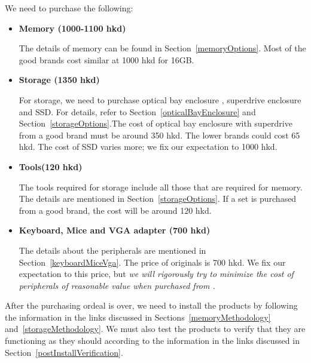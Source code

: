 We need to purchase the following:
\begin{itemize}
\item \textbf{Memory (1000-1100 hkd)}

The details of memory can be found in Section~\ref{memoryOptions}. Most of the good brands cost similar at 1000 hkd for 16GB.

\item \textbf{Storage (1350 hkd)}

For storage, we need to purchase optical bay enclosure , superdrive enclosure and SSD. For details, refer to Section~\ref{opticalBayEnclosure} and Section~\ref{storageOptions}.The cost of optical bay enclosure with superdrive from a good brand must be around 350 hkd. The lower brands could cost 65 hkd. The cost of SSD varies more; we fix our expectation to 1000 hkd.

\item \textbf{Tools\footnotemark (120 hkd)}

The tools required for storage include all those that are required for memory. The details are mentioned in Section~\ref{storageOptions}. If a set is purchased from a good brand, the cost will be around 120 hkd.


\item \textbf{Keyboard, Mice and VGA adapter (700 hkd)}

The details about the peripherals are mentioned in Section~\ref{keyboardMiceVga}. The price of originals is 700 hkd. We fix our expectation to this price, but \emph{we will rigorously try to minimize the cost of peripherals of reasonable value when purchased from \market.}

\end{itemize}

After the purchasing ordeal is over, we need to install the products by following the information in the links discussed in Sections~\ref{memoryMethodology} and~\ref{storageMethodology}. We must also test the products to verify that they are functioning as they should according to the information in the links discussed in Section~\ref{postInstallVerification}.

